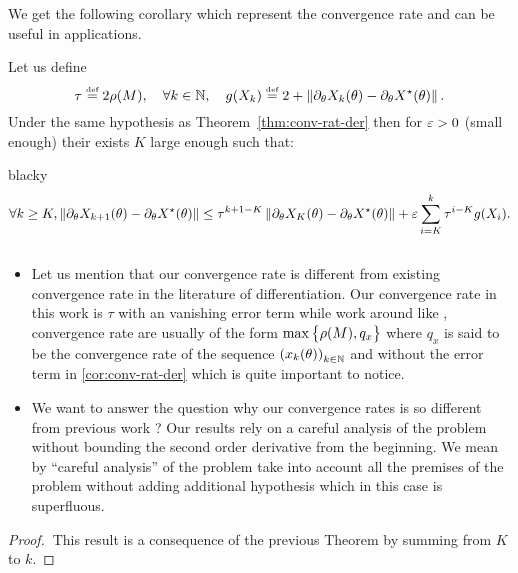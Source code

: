 We get the following corollary which represent  the convergence rate and can be useful in applications. 
\begin{corollary}
Let us  define 
\[
\tau\stackrel{\text{\rm\tiny def}}{=} 2\rho(M),\quad  \forall k\in\mathbb{N}, \quad g(X_k)\stackrel{\text{\rm\tiny def}}{=} 2+\left\Vert {\partial_{\theta}X_k(\theta)-\partial_{\theta}X^{\star}(\theta)} \right\Vert.
\]
Under the same hypothesis  as Theorem~\ref{thm:conv-rat-der} then for $\varepsilon>0$ (small enough) their exists $K$ large enough such that:
\begin{centerbox}{black}{}y
\begin{multline}\label{cor:conv-rat-der}
\forall k\geq K,  \left\Vert {\partial_{\theta}X_{k+1}(\theta)-\partial_{\theta}X^{\star}(\theta)} \right\Vert\leq \tau^{k+1-K}\left\Vert {\partial_{\theta}X_K(\theta)-\partial_{\theta} X^{\star}(\theta)} \right\Vert+\varepsilon\sum_{i=K}^k\tau^{i-K}g(X_i).
\end{multline}
\end{centerbox}
\end{corollary}
\begin{remark}$~$
\begin{itemize}

\item Let us  mention that our convergence rate is different from existing convergence rate in the literature of differentiation. Our convergence rate in this work is $\tau$  with an vanishing error term while work around like \cite{mehmood19}, convergence rate are usually of the form  $\max\big\{\rho(M),q_x\big\}$ where $q_x$ is said to be the convergence rate of the sequence $\left(x_{k}(\theta)\right)_{k\in\mathbb{N}}$ and without the error term in \eqref{cor:conv-rat-der}  which is quite important to notice. 
\item We  want to answer the question why our convergence rates is so different from previous work ? Our results rely on a careful analysis of the problem without bounding  the second order derivative from the beginning. We mean by ``careful analysis'' of the problem take into account all the premises of the problem without adding additional hypothesis which in this case is superfluous.
\end{itemize}
\end{remark}
\begin{proof}$~$This result is a  consequence of the previous Theorem by summing from  $K$ to $k$. 
\end{proof}

















